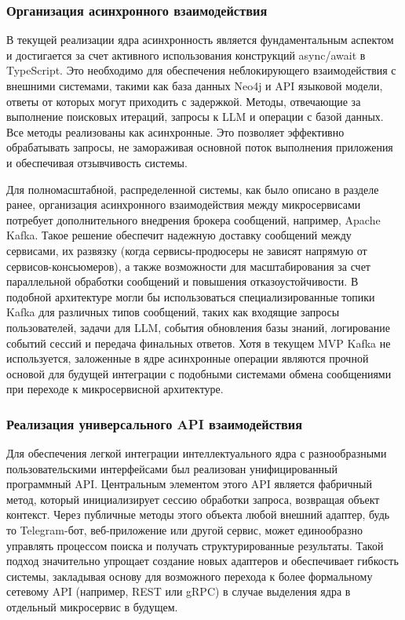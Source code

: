 \subsubsection{Организация асинхронного взаимодействия}

В текущей реализации ядра асинхронность является фундаментальным аспектом и достигается за счет активного использования конструкций async/await в TypeScript. Это необходимо для обеспечения неблокирующего взаимодействия с внешними системами, такими как база данных Neo4j и API языковой модели, ответы от которых могут приходить с задержкой. Методы, отвечающие за выполнение поисковых итераций, запросы к LLM и операции с базой данных. Все методы реализованы как асинхронные. Это позволяет эффективно обрабатывать запросы, не замораживая основной поток выполнения приложения и обеспечивая отзывчивость системы.

Для полномасштабной, распределенной системы, как было описано в разделе ранее, организация асинхронного взаимодействия между микросервисами потребует дополнительного внедрения брокера сообщений, например, Apache Kafka. Такое решение обеспечит надежную доставку сообщений между сервисами, их развязку (когда сервисы-продюсеры не зависят напрямую от сервисов-консьюмеров), а также возможности для масштабирования за счет параллельной обработки сообщений и повышения отказоустойчивости. В подобной архитектуре могли бы использоваться специализированные топики Kafka для различных типов сообщений, таких как входящие запросы пользователей, задачи для LLM, события обновления базы знаний, логирование событий сессий и передача финальных ответов. Хотя в текущем MVP Kafka не используется, заложенные в ядре асинхронные операции являются прочной основой для будущей интеграции с подобными системами обмена сообщениями при переходе к микросервисной архитектуре.

\subsubsection{Реализация универсального API взаимодействия}

Для обеспечения легкой интеграции интеллектуального ядра с разнообразными пользовательскими интерфейсами был реализован унифицированный программный API. Центральным элементом этого API является фабричный метод, который инициализирует сессию обработки запроса, возвращая объект контекст. Через публичные методы этого объекта любой внешний адаптер, будь то Telegram-бот, веб-приложение или другой сервис, может единообразно управлять процессом  поиска и получать структурированные результаты. Такой подход значительно упрощает создание новых адаптеров и обеспечивает гибкость системы, закладывая основу для возможного перехода к более формальному сетевому API (например, REST или gRPC) в случае выделения ядра в отдельный микросервис в будущем.

